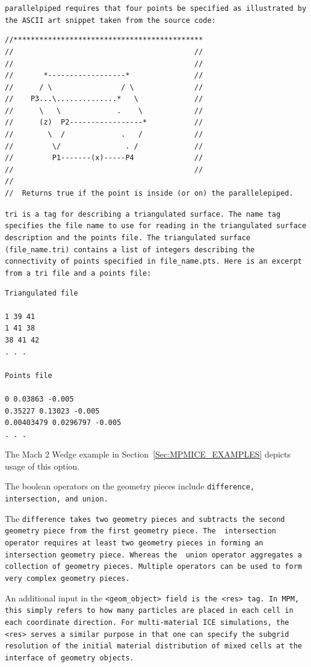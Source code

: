 \tt parallelpiped \normalfont requires that four points be specified as
illustrated by the ASCII art snippet taken from the source code:

\begin{Verbatim}[fontsize=\footnotesize]
//********************************************
//                                          //
//                                          //
//       *------------------*               //
//      / \                / \              //
//    P3...\..............*   \             //
//      \   \             .    \            //
//      (z)  P2-----------------*           //
//        \  /             .   /            //
//         \/               . /             //
//         P1-------(x)-----P4              //
//                                          //
//
//  Returns true if the point is inside (or on) the parallelepiped.

\end{Verbatim}

\tt tri \normalfont is a tag for describing a triangulated surface.
The name tag specifies the file name to use for reading in the
triangulated surface description and the points file.  The
triangulated surface (file\_name.tri) contains a list of integers
describing the connectivity of points specified in file\_name.pts.
Here is an excerpt from a tri file and a points file:

\begin{Verbatim}[fontsize=\footnotesize]
Triangulated file

1 39 41
1 41 38
38 41 42
. . .

Points file

0 0.03863 -0.005
0.35227 0.13023 -0.005
0.00403479 0.0296797 -0.005
. . .
\end{Verbatim}
The Mach 2 Wedge example in Section~\ref{Sec:MPMICE_EXAMPLES} depicts usage of
this option.

The boolean operators on the geometry pieces include \tt difference,
intersection, \normalfont and \tt union.\normalfont

The \tt difference \normalfont takes two geometry pieces and subtracts
the second geometry piece from the first geometry piece.  The \tt
intersection \normalfont operator requires at least two geometry
pieces in forming an intersection geometry piece.  Whereas the \tt
union \normalfont operator aggregates a collection of geometry pieces.
Multiple operators can be used to form very complex geometry pieces.

An additional input in the \tt <geom\_object> \normalfont field is the
\tt <res> \normalfont tag.  In MPM, this simply refers to how many particles
are placed in each cell in each coordinate direction.  For multi-material ICE
simulations, the \tt <res> \normalfont serves a similar purpose in that one
can specify the subgrid resolution of the initial material distribution
of mixed cells at the interface of geometry objects.

